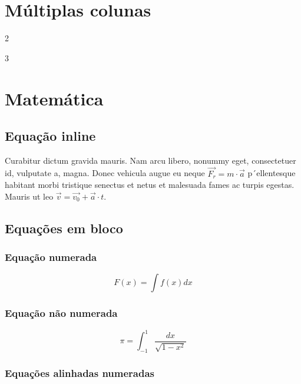 \documentclass[twoside]{article}
\begin{document}
	\section{Múltiplas colunas}
	
	\begin{multicols}{2}
		\lipsum[1-2]
	\end{multicols}

	\begin{multicols}{3}
		\lipsum[3-4]
	\end{multicols}

	\section{Matemática}
	
	\subsection{Equação inline}
	Curabitur dictum gravida mauris. Nam arcu libero, nonummy eget, consectetuer id, vulputate a, magna. Donec vehicula augue eu neque $\vec{F_{r}} = m \cdot \vec{a}$ p´ellentesque habitant morbi tristique senectus et netus et malesuada fames ac turpis egestas. Mauris ut leo $\vec{v} = \vec{v_0} + \vec{a} \cdot t$.
	
	\subsection{Equações em bloco}
	
	\subsubsection{Equação numerada}
	
	\begin{equation}
		F(x) = \int f(x) dx
		\label{eq:antideriv}
	\end{equation}
	
	\subsubsection{Equação não numerada}
	
	\begin{equation*}
		\pi = \int_{-1}^{1} \frac{dx}{\sqrt{1-x^2}}
	\end{equation*}

	\subsubsection{Equações alinhadas numeradas}
\end{document}

